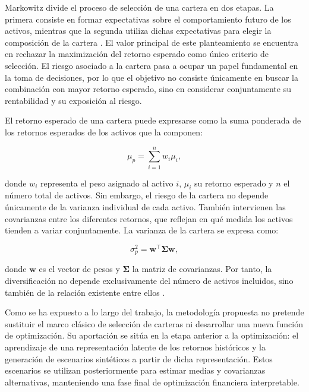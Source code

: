 Markowitz divide el proceso de selección de una cartera en dos etapas. La primera consiste en formar expectativas sobre el comportamiento futuro de los activos, mientras que la segunda utiliza dichas expectativas para elegir la composición de la cartera \citeyear{markowitz1952}. El valor principal de este planteamiento se encuentra en rechazar la maximización del retorno esperado como único criterio de selección. El riesgo asociado a la cartera pasa a ocupar un papel fundamental en la toma de decisiones, por lo que el objetivo no consiste únicamente en buscar la combinación con mayor retorno esperado, sino en considerar conjuntamente su rentabilidad y su exposición al riesgo.

El retorno esperado de una cartera puede expresarse como la suma ponderada de los retornos esperados de los activos que la componen:

\begin{equation}
\mu_p = \sum_{i=1}^{n} w_i \mu_i,
\end{equation}

donde \(w_i\) representa el peso asignado al activo \(i\), \(\mu_i\) su retorno esperado y \(n\) el número total de activos. Sin embargo, el riesgo de la cartera no depende únicamente de la varianza individual de cada activo. También intervienen las covarianzas entre los diferentes retornos, que reflejan en qué medida los activos tienden a variar conjuntamente. La varianza de la cartera se expresa como:

\begin{equation}
\sigma_p^2 = \mathbf{w}^{\top}\boldsymbol{\Sigma}\mathbf{w},
\end{equation}

donde \(\mathbf{w}\) es el vector de pesos y \(\boldsymbol{\Sigma}\) la matriz de covarianzas. Por tanto, la diversificación no depende exclusivamente del número de activos incluidos, sino también de la relación existente entre ellos \cite{markowitz1952}.

Como se ha expuesto a lo largo del trabajo, la metodología propuesta no pretende sustituir el marco clásico de selección de carteras ni desarrollar una nueva función de optimización. Su aportación se sitúa en la etapa anterior a la optimización: el aprendizaje de una representación latente de los retornos históricos y la generación de escenarios sintéticos a partir de dicha representación. Estos escenarios se utilizan posteriormente para estimar medias y covarianzas alternativas, manteniendo una fase final de optimización financiera interpretable.

